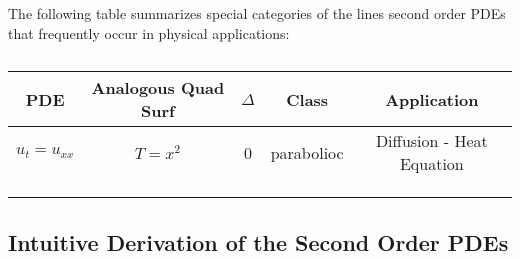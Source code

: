 The following table summarizes special categories of the lines second order PDEs that frequently occur in physical applications: \newline

\begin{table}[]
	\centering
	\begin{tabular}{c|c|c|c|c}
		PDE             & Analogous Quad Surf & $\Delta$ & Class      & Application               \\ \hline
		$ u_t = u_{xx}$ & $T = x^2$           & 0        & parabolioc & Diffusion - Heat Equation \\ \hline
		&                     &          &            &                           \\ \hline
		&                     &          &            &                           \\ \hline
		&                     &          &            &                          
	\end{tabular}
	\caption{}
	\label{tab:my-table}
\end{table}

\subsection{Intuitive Derivation of the Second Order PDEs}